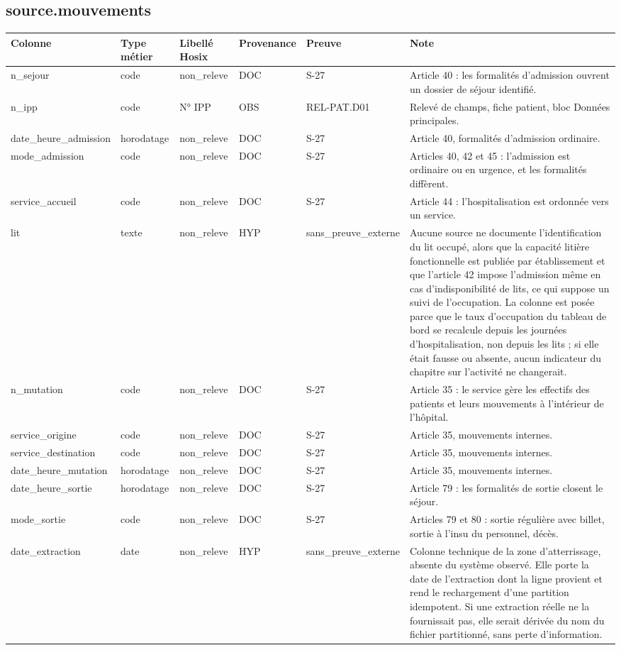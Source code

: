 \subsection*{source.mouvements}
\begin{longtable}{p{2.5cm}p{1.8cm}p{2.8cm}p{1.3cm}p{2.2cm}p{5cm}}
\hline
Colonne & Type métier & Libellé Hosix & Provenance & Preuve & Note \\
\hline
\endhead
n\_sejour & code & non\_releve & DOC & S-27 & Article 40 : les formalités d'admission ouvrent un dossier de séjour identifié. \\
n\_ipp & code & N° IPP & OBS & REL-PAT.D01 & Relevé de champs, fiche patient, bloc Données principales. \\
date\_heure\_admission & horodatage & non\_releve & DOC & S-27 & Article 40, formalités d'admission ordinaire. \\
mode\_admission & code & non\_releve & DOC & S-27 & Articles 40, 42 et 45 : l'admission est ordinaire ou en urgence, et les formalités diffèrent. \\
service\_accueil & code & non\_releve & DOC & S-27 & Article 44 : l'hospitalisation est ordonnée vers un service. \\
lit & texte & non\_releve & HYP & sans\_preuve\_externe & Aucune source ne documente l'identification du lit occupé, alors que la capacité litière fonctionnelle est publiée par établissement et que l'article 42 impose l'admission même en cas d'indisponibilité de lits, ce qui suppose un suivi de l'occupation. La colonne est posée parce que le taux d'occupation du tableau de bord se recalcule depuis les journées d'hospitalisation, non depuis les lits ; si elle était fausse ou absente, aucun indicateur du chapitre sur l'activité ne changerait. \\
n\_mutation & code & non\_releve & DOC & S-27 & Article 35 : le service gère les effectifs des patients et leurs mouvements à l'intérieur de l'hôpital. \\
service\_origine & code & non\_releve & DOC & S-27 & Article 35, mouvements internes. \\
service\_destination & code & non\_releve & DOC & S-27 & Article 35, mouvements internes. \\
date\_heure\_mutation & horodatage & non\_releve & DOC & S-27 & Article 35, mouvements internes. \\
date\_heure\_sortie & horodatage & non\_releve & DOC & S-27 & Article 79 : les formalités de sortie closent le séjour. \\
mode\_sortie & code & non\_releve & DOC & S-27 & Articles 79 et 80 : sortie régulière avec billet, sortie à l'insu du personnel, décès. \\
date\_extraction & date & non\_releve & HYP & sans\_preuve\_externe & Colonne technique de la zone d'atterrissage, absente du système observé. Elle porte la date de l'extraction dont la ligne provient et rend le rechargement d'une partition idempotent. Si une extraction réelle ne la fournissait pas, elle serait dérivée du nom du fichier partitionné, sans perte d'information. \\
\hline
\end{longtable}

